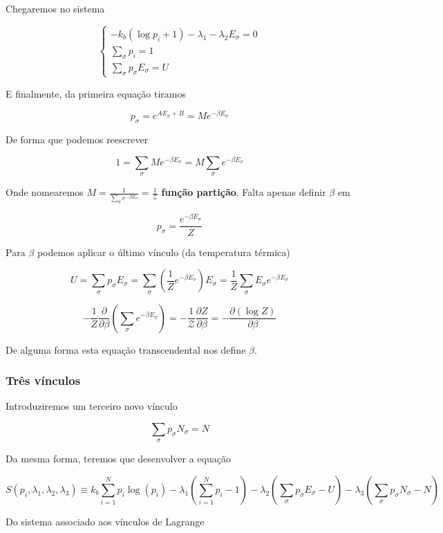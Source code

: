 Chegaremos no sistema


\[
\begin{cases}
	-k_b (\log{p_i} + 1) - \lambda_1 - \lambda_2 E_\sigma  = 0\\
	\sum_{\sigma} p_i = 1 \\
	\sum_{\sigma} p_\sigma E_\sigma = U
\end{cases}
\]

E finalmente, da primeira equação tiramos

\[
p_\sigma = e^{A E_\sigma + B} = M e^{-\beta E_\sigma}
\]

De forma que podemos reescrever

\[
1 = \sum_\sigma M e^{-\beta E_\sigma} = M \sum_\sigma e^{-\beta E_\sigma}
\]

Onde nomearemos $M = \frac{1}{\sum_{\sigma}e^{-\beta E_\sigma}} = \frac{1}{\mathcal{Z}}$ \textbf{função partição}. Falta apenas definir $\beta$ em

\[
p_\sigma = \frac{e^{-\beta E_\sigma}}{Z}
\]

Para $\beta$ podemos aplicar o último vínculo (da temperatura térmica)

\[
U = \sum_\sigma p_\sigma E_\sigma = \sum_\sigma \left( \frac{1}{Z} e^{-\beta E_\sigma} \right) E_\sigma = \frac{1}{Z} \sum_\sigma E_\sigma e^{-\beta E_\sigma}
\]

\[
-\frac{1}{Z} \frac{\partial }{ \partial \beta} \left( \sum_\sigma e^{-\beta E_\sigma} \right) = -\frac{1}{\mathcal{Z}} \frac{\partial Z}{\partial \beta} = - \frac{\partial (\log{Z})}{\partial \beta}
\]

De alguma forma esta equação transcendental nos define $\beta$.

\subsubsection{Três vínculos}

Introduziremos um terceiro novo vínculo

\[
	\sum_\sigma p_\sigma N_\sigma = N
\]

Da mesma forma, teremos que desenvolver a equação

\[
S({p_i}, \lambda_1, \lambda_2, \lambda_3) \equiv k_b \sum_{i=1}^{N} p_i \log{(p_i)} - \lambda_1 \left( \sum_{i=1}^{N}p_i -1 \right)  - \lambda_2 \left( \sum_\sigma  p_\sigma E_\sigma - U \right) - \lambda_3 \left( \sum_\sigma  p_\sigma N_\sigma - N \right) 
\]

Do sistema associado aos vínculos de Lagrange

